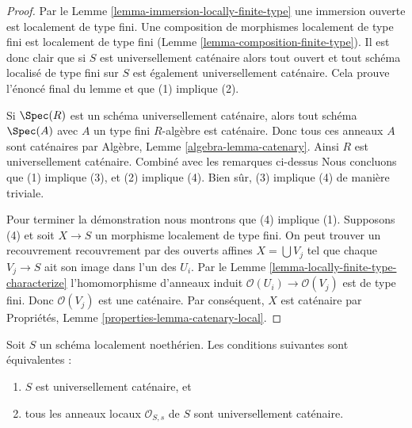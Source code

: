 \begin{proof}
Par le Lemme \ref{lemma-immersion-locally-finite-type} une immersion ouverte est localement de type
fini. Une composition de morphismes localement de type fini est
localement de type fini (Lemme \ref{lemma-composition-finite-type}).
Il est donc clair que si $S$ est universellement caténaire
alors tout ouvert et tout schéma localisé de type fini sur $S$
est également universellement caténaire. Cela prouve l’énoncé
final du lemme et que (1) implique (2).

\medskip\noindent Si
$\Spec(R)$ est un schéma universellement caténaire, alors tout schéma
$\Spec(A)$ avec $A$ un type fini $R$-algèbre
est caténaire. Donc tous ces anneaux $A$ sont caténaires
par Algèbre, Lemme \ref{algebra-lemma-catenary}. Ainsi $R$
est universellement caténaire. Combiné avec les remarques ci-dessus Nous concluons
que (1) implique (3), et (2) implique (4). Bien sûr, (3) implique
(4) de manière triviale.

\medskip\noindent
Pour terminer la démonstration nous montrons
que (4) implique (1). Supposons (4) et soit $X \to S$ un morphisme
localement de type fini. On peut trouver un recouvrement
recouvrement par des ouverts affines $X = \bigcup V_j$ tel que chaque $V_j \to S$
ait son image dans l'un des $U_i$. Par le Lemme
\ref{lemma-locally-finite-type-characterize} l'homomorphisme d'anneaux induit $\mathcal{O}(U_i) \to \mathcal{O}(V_j)$ est
de type fini. Donc $\mathcal{O}(V_j)$ est une caténaire. Par
conséquent, $X$ est caténaire par Propriétés, Lemme \ref{properties-lemma-catenary-local}.
\end{proof}

\begin{lemma}
\label{lemma-universally-catenary-local-rings-universally-catenary}
Soit $S$ un schéma localement noethérien. Les conditions
suivantes sont équivalentes :
\begin{enumerate}
\item $S$ est universellement caténaire, et
\item tous les anneaux locaux $\mathcal{O}_{S, s}$ de $S$ sont universellement caténaire.
\end{enumerate}
\end{lemma}

